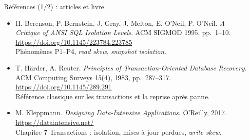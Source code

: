 \documentclass[aspectratio=169,10pt]{beamer}
\begin{document}
\begin{frame}{R\'ef\'erences (1/2) : articles et livre}
  \footnotesize
  \begin{itemize}\setlength{\itemsep}{1.2ex}
    \item H. Berenson, P. Bernstein, J. Gray, J. Melton, E. O'Neil, P. O'Neil.
      \textit{A Critique of ANSI SQL Isolation Levels}. ACM SIGMOD 1995, pp.~1--10.
      \url{https://doi.org/10.1145/223784.223785}\\
      {\color{qamuted}Phénom\`enes P1--P4, \textit{read skew}, \textit{snapshot isolation}.}
    \item T. H\"arder, A. Reuter.
      \textit{Principles of Transaction-Oriented Database Recovery}. ACM Computing Surveys 15(4), 1983, pp.~287--317.
      \url{https://doi.org/10.1145/289.291}\\
      {\color{qamuted}R\'ef\'erence classique sur les transactions et la reprise apr\`es panne.}
    \item M. Kleppmann. \textit{Designing Data-Intensive Applications}. O'Reilly, 2017.
      \url{https://dataintensive.net/}\\
      {\color{qamuted}Chapitre 7 \og Transactions \fg{} : isolation, mises \`a jour perdues, \textit{write skew}.}
  \end{itemize}
\end{frame}
\end{document}
